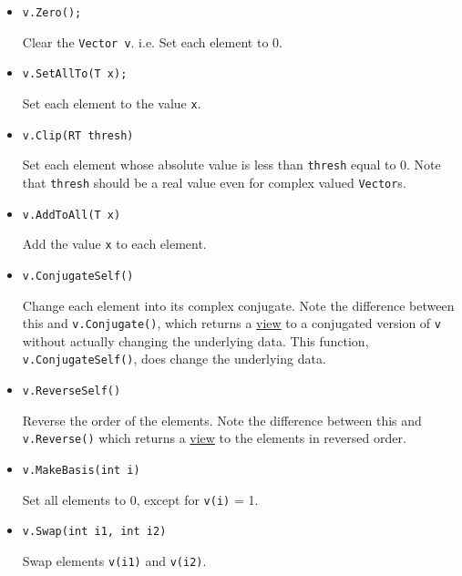 \documentclass[twoside,letterpaper,11pt]{article}
\renewcommand{\tt}[1]{{\texttt {#1}}}
\begin{document}
\begin{itemize}

\item
\begin{verbatim}
v.Zero();
\end{verbatim}
Clear the \tt{Vector v}.  i.e. Set each element to 0.

\item
\begin{verbatim}
v.SetAllTo(T x);
\end{verbatim}
Set each element to the value \tt{x}.

\item
\begin{verbatim}
v.Clip(RT thresh)
\end{verbatim}
Set each element whose absolute value is less than \tt{thresh} equal to 0.
Note that \tt{thresh} should be a real value even for complex valued
\tt{Vector}s.

\item
\begin{verbatim}
v.AddToAll(T x)
\end{verbatim}
Add the value \tt{x} to each element.

\item 
\begin{verbatim}
v.ConjugateSelf()
\end{verbatim}
Change each element into its complex conjugate.  
Note the difference between this and \tt{v.Conjugate()}, 
which returns a \underline{view} to a conjugated version of \tt{v} without
actually changing the underlying data.  This function, \tt{v.ConjugateSelf()},
does change the underlying data.

\item
\begin{verbatim}
v.ReverseSelf()
\end{verbatim}
Reverse the order of the elements.  Note the difference between this and 
\tt{v.Reverse()} which returns a \underline{view} to the elements in 
reversed order.

\item
\begin{verbatim}
v.MakeBasis(int i)
\end{verbatim}
Set all elements to 0, except for \tt{v(i)} = 1.

\item
\begin{verbatim}
v.Swap(int i1, int i2)
\end{verbatim}
Swap elements \tt{v(i1)} and \tt{v(i2)}.


\end{itemize}
\end{document}

